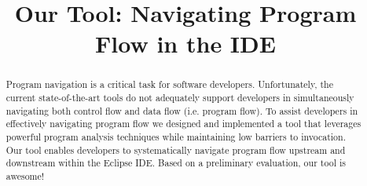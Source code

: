 \documentclass[conference]{IEEEtran}
\begin{document}
%
\title{Our Tool: Navigating Program Flow in the IDE}


\author{
}

\maketitle

\begin{abstract}
Program navigation is a critical task for software developers. 
Unfortunately, the current state-of-the-art tools do not adequately support developers in simultaneously navigating both control flow and data flow (i.e. program flow). 
To assist developers in effectively navigating program flow we designed and implemented a tool that leverages powerful program analysis techniques while maintaining low barriers to invocation.
Our tool enables developers to systematically navigate program flow upstream and downstream within the Eclipse IDE.
Based on a preliminary evaluation, our tool is awesome!  
\end{abstract}





%
\IEEEpeerreviewmaketitle
\end{document}
